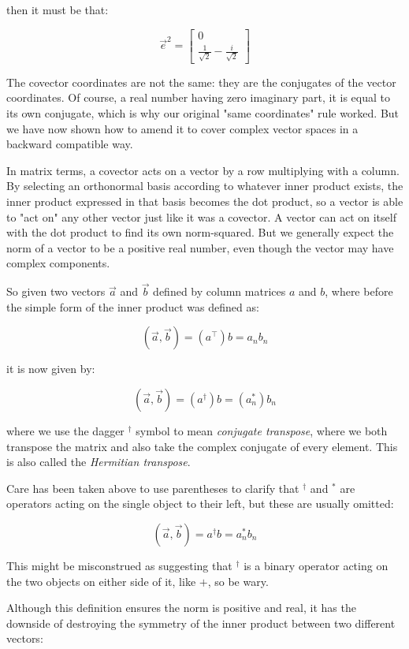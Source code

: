 then it must be that:

$$
\vec{e}^2 = \begin{bmatrix}0 \\ \frac{1}{\sqrt{2}} - \frac{i}{\sqrt{2}}\end{bmatrix}
$$

The covector coordinates are not the same: they are the conjugates of the vector coordinates. Of course, a real number having zero imaginary part, it is equal to its own conjugate, which is why our original "same coordinates" rule worked. But we have now shown how to amend it to cover complex vector spaces in a backward compatible way.

In matrix terms, a covector acts on a vector by a row multiplying with a column. By selecting an orthonormal basis according to whatever inner product exists, the inner product expressed in that basis becomes the dot product, so a vector is able to "act on" any other vector just like it was a covector. A vector can act on itself with the dot product to find its own norm-squared. But we generally expect the norm of a vector to be a positive real number, even though the vector may have complex components.

So given two vectors $\vec{a}$ and $\vec{b}$ defined by column matrices $a$ and $b$, where before the simple form of the inner product was defined as:

$$
(\vec{a}, \vec{b}) = (a^\intercal) b = a_n b_n
$$

it is now given by:

$$
(\vec{a}, \vec{b}) = (a^\dagger) b = (a_n^*) b_n
$$

where we use the dagger $^\dagger$ symbol to mean \textit{conjugate transpose}, where we both transpose the matrix and also take the complex conjugate of every element. This is also called the \textit{Hermitian transpose}.

Care has been taken above to use parentheses to clarify that $^\dagger$ and $^*$ are operators acting on the single object to their left, but these are usually omitted:

$$
(\vec{a}, \vec{b}) = a^\dagger b = a_n^* b_n
$$

This might be misconstrued as suggesting that $^\dagger$ is a binary operator acting on the two objects on either side of it, like $+$, so be wary.

Although this definition ensures the norm is positive and real, it has the downside of destroying the symmetry of the inner product between two different vectors:

